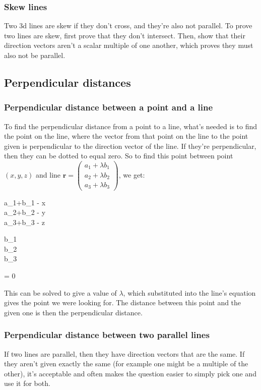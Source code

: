 \subsubsection{Skew lines}
Two 3d lines are skew if they don't cross, and they're also not parallel. To prove two lines are skew, first prove that they don't intersect. Then, show that their direction vectors aren't a scalar multiple of one another, which proves they must also not be parallel.

\subsection{Perpendicular distances}
\subsubsection{Perpendicular distance between a point and a line}
To find the perpendicular distance from a point to a line, what's needed is to find the point on the line, where the vector from that point on the line to the point given is perpendicular to the direction vector of the line. If they're perpendicular, then they can be dotted to equal zero. So to find this point between point $(x, y, z)$ and line $\mathbf{r}=\begin{pmatrix}a_1+\lambda b_1\\a_2+\lambda b_2\\a_3+\lambda b_3\end{pmatrix}$, we get:

\begin{ea}
	\begin{pmatrix}a_1+\lambda b_1 - x\\a_2+\lambda b_2 - y\\a_3+\lambda b_3 - z\end{pmatrix} \cdot \begin{pmatrix}b_1\\b_2\\b_3\end{pmatrix} = 0
\end{ea}

This can be solved to give a value of $\lambda$, which substituted into the line's equation gives the point we were looking for. The distance between this point and the given one is then the perpendicular distance.

\subsubsection{Perpendicular distance between two parallel lines}
If two lines are parallel, then they have direction vectors that are the same. If they aren't given exactly the same (for example one might be a multiple of the other), it's acceptable and often makes the question easier to simply pick one and use it for both.
